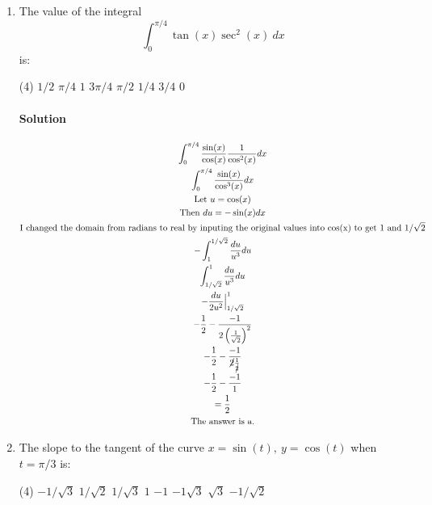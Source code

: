 \documentclass[MATH-115-Notes.tex]{subfiles}
\begin{document}
\begin{enumerate}[itemsep=5mm]
    \item The value of the integral \[\int_{0}^{\pi/4}\tan(x)\sec^2(x)\ dx\] is:
    \begin{tasks}(4)
        \task \(1/2\)
        \task \(\pi/4\)
        \task \(1\)
        \task \(3\pi/4\)
        \task \(\pi/2\)
        \task \(1/4\)
        \task \(3/4\)
        \task \(0\)
    \end{tasks}
    \paragraph*{Solution}
    \begin{gather*}
        \int_{0}^{\pi/4}\frac{\sin(x)}{\cos(x)}\frac{1}{\cos^2(x)}dx\\
        \int_{0}^{\pi/4}\frac{\sin(x)}{\cos^3(x)}dx\\
        \text{Let } u = \cos(x)\\
        \text{Then } du = -\sin(x)dx\\
        \text{I changed the domain from radians to real by inputing the original values into cos(x) to get 1 and $1/\sqrt{2}$}\\
        -\int_{1}^{1/\sqrt{2}}\frac{du}{u^3}du\\
        \int_{1/\sqrt{2}}^{1}\frac{du}{u^3}du\\
        -\frac{du}{2u^2}\Big|_{1/\sqrt{2}}^1\\
        -\frac{1}{2}-\frac{-1}{2\left(\frac{1}{\sqrt{2}}\right)^2}\\
        -\frac{1}{2}-\frac{-1}{\cancel{2}\frac{1}{\cancel{2}}}\\
        -\frac{1}{2}-\frac{-1}{1}\\
        = \frac{1}{2}\\
        \text{The answer is a.}
    \end{gather*}
    
    \item The slope to the tangent of the curve $x = \sin(t),\ y = \cos(t)$ when $t = \pi/3$ is:
    \begin{tasks}(4)
        \task \(-1/\sqrt{3}\)
        \task \(1/\sqrt{2}\)
        \task \(1/\sqrt{3}\)
        \task \(1\)
        \task \(-1\)
        \task \(-1\sqrt{3}\)
        \task \(\sqrt{3}\)
        \task \(-1/\sqrt{2}\)
    \end{tasks}

\end{enumerate}
\end{document}
